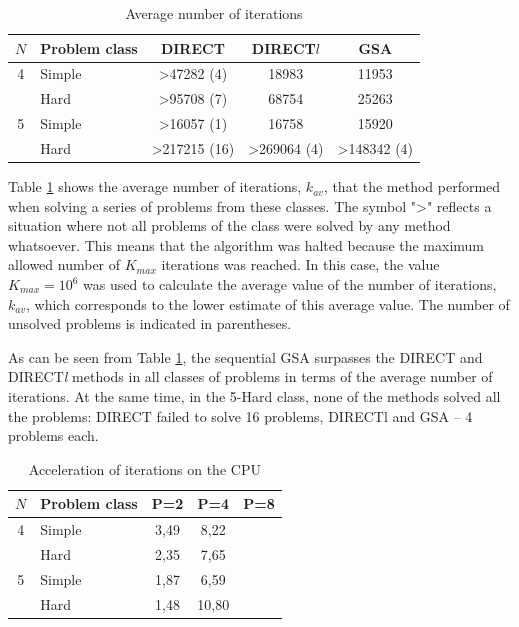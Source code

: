 \documentclass{svproc}
\begin{document}
\begin{table}
    \centering
    \begin{tabular}{|c|p{3cm}|c|c|c|}
    \hline
    \(N\) & Problem class & DIRECT & DIRECT\(l\) & GSA \\ \hline
    4 & Simple & >47282 (4) & 18983 & 11953\\ \cline{2-5}
      & Hard & >95708 (7) & 68754 & 25263\\ \hline
    5 & Simple &>16057 (1) & 16758 & 15920\\ \cline{2-5}
      & Hard & >217215 (16) & >269064 (4) & >148342 (4)\\ \hline
    \end{tabular}
    \caption{Average number of iterations}
    \label{table:average_iters}
\end{table} 

   Table \ref{table:average_iters} shows the average number of iterations, $k_{av}$, that the method performed when solving a series of problems from these classes. The symbol ">" reflects a situation where not all problems of the class were solved by any method whatsoever. This means that the algorithm was halted because the maximum allowed number of $K_{max}$ iterations was reached. In this case, the value $K_{max} = 10^6$ was used to calculate the average value of the number of iterations, $k_{av}$, which corresponds to the lower estimate of this average value. The number of unsolved problems is indicated in parentheses.
   
  As can be seen from Table \ref{table:average_iters}, the sequential GSA surpasses the DIRECT and DIRECT\textit{l} methods in all classes of problems in terms of the average number of iterations. At the same time, in the 5-Hard class, none of the methods solved all the problems: DIRECT failed to solve 16 problems, DIRECTl and GSA -- 4 problems each.


\begin{table}
    \centering
    \begin{tabular}{|c|p{3cm}|c|c|c|}
    \hline
    \(N\) & Problem class & P=2 & P=4 & P=8 \\ \hline
    4 & Simple  & 3,49 & 8,22  &  \\ \cline{2-5}
      & Hard    & 2,35 & 7,65  &  \\ \hline
    5 & Simple  & 1,87 & 6,59  &  \\ \cline{2-5}
      & Hard    & 1,48 & 10,80  &   \\ \hline
    \end{tabular}
    \caption{Acceleration of iterations on the CPU}
    \label{table:average_iters_AS_CPU}
\end{table}
\end{document}
